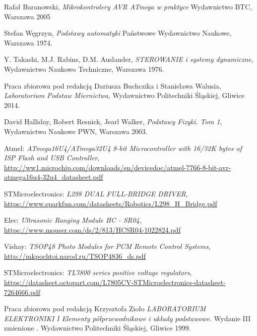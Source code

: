 \documentclass[11pt]{article}
\begin{document}
\begin{thebibliography}{9}

Rafał Baranowski,
\textit{Mikrokontrolery AVR ATmega w praktyce}
Wydawnictwo BTC, Warszawa 2005

Stefan Węgrzyn,
\textit{Podstawy automatyki}
Państwowe Wydawnictwo Naukowe, Warszawa 1974.

Y. Takashi, M.J. Rabins, D.M. Auslander,
\textit{STEROWANIE i systemy dynamiczne},
Wydawnictwo Naukowo Techniczne, Warszawa 1976.

Praca zbiorowa pod redakcją Dariusza Buchczika i Stanisława Walusia,
\textit{Laboratorium Podstaw Miernictwa},
Wydawnictwo Politechniki Śląskiej, Gliwice 2014.

David Halliday, Robert Resnick, Jearl Walker,
\textit{Podstawy Fizyki. Tom 1},
Wydawnictwo Naukowe PWN, Warszawa 2003.

Atmel: \textit{ATmega16U4/ATmega32U4 8-bit Microcontroller with 16/32K bytes of ISP Flash and USB Controller}, \url{http://ww1.microchip.com/downloads/en/devicedoc/atmel-7766-8-bit-avr-atmega16u4-32u4\_datasheet.pdf}

STMicroelectronics: \textit{L298
DUAL FULL-BRIDGE DRIVER}, \url{https://www.sparkfun.com/datasheets/Robotics/L298_H_Bridge.pdf}

Elec: \textit{Ultrasonic Ranging Module HC - SR04}, \url{https://www.mouser.com/ds/2/813/HCSR04-1022824.pdf}

Vishay: \textit{TSOP48 Photo Modules for PCM Remote Control Systems}, \url{http://mkpochtoi.narod.ru/TSOP4836_ds.pdf}

STMicroelectronics: \textit{TL7800 series positive voltage regulators}, \url{https://datasheet.octopart.com/L7805CV-STMicroelectronics-datasheet-7264666.pdf}

Praca zbiorowa pod redakcją Krzysztofa Zioło
\textit{LABORATORIUM ELEKTRONIKI I Elementy półprzewodnikowe i układy podstawowe}.
Wydanie III zmienione .
Wydawnictwo Politechniki Śląskiej, Gliwice 1999.

\end{thebibliography}
\end{document}
